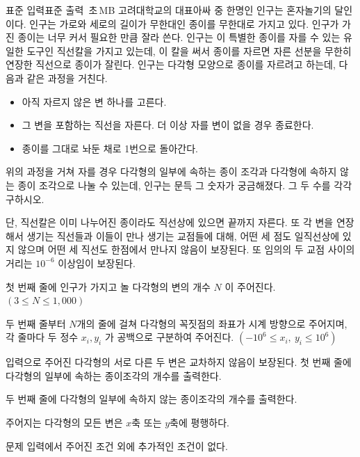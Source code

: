 \begin{problem}{\kcpcpapercuttitle}
    {표준 입력}{표준 출력}
    {\kcpcpapercuttime\,초}{\kcpcpapercutmemory\,MB}{}{\kcpcpapercutscore}
    고려대학교의 대표아싸 중 한명인 인구는 혼자놀기의 달인이다. 인구는 가로와 세로의 길이가 무한대인 종이를 무한대로 가지고 있다. 인구가 가진 종이는 너무 커서 필요한 만큼 잘라 쓴다. 인구는 이 특별한 종이를 자를 수 있는 유일한 도구인 직선칼을 가지고 있는데, 이 칼을 써서 종이를 자르면 자른 선분을 무한히 연장한 직선으로 종이가 잘린다. 인구는 다각형 모양으로 종이를 자르려고 하는데, 다음과 같은 과정을 거친다.
    
    \begin{itemize}
        \item 아직 자르지 않은 변 하나를 고른다.
        \item 그 변을 포함하는 직선을 자른다. 더 이상 자를 변이 없을 경우 종료한다.
        \item 종이를 그대로 놔둔 채로 1번으로 돌아간다.
    \end{itemize}
    위의 과정을 거쳐 자를 경우 다각형의 일부에 속하는 종이 조각과 다각형에 속하지 않는 종이 조각으로 나눌 수 있는데, 인구는 문득 그 숫자가 궁금해졌다. 그 두 수를 각각 구하시오.
    
    단, 직선칼은 이미 나누어진 종이라도 직선상에 있으면 끝까지 자른다. 또 각 변을 연장해서 생기는 직선들과 이들이 만나 생기는 교점들에 대해, 어떤 세 점도 일직선상에 있지 않으며 어떤 세 직선도 한점에서 만나지 않음이 보장된다. 또 임의의 두 교점 사이의 거리는 $ 10^{-6} $ 이상임이 보장된다.
    
    \InputFile
    첫 번째 줄에 인구가 가지고 놀 다각형의 변의 개수 $ N $ 이 주어진다. $ (3 \leq N \leq 1,000) $
    
    두 번째 줄부터 $ N $개의 줄에 걸쳐 다각형의 꼭짓점의 좌표가 시계 방향으로 주어지며, 각 줄마다 두 정수 $ x_i, y_i $ 가 공백으로 구분하여 주어진다. $ (-10^6 \leq x_i,\ y_i \leq 10^6) $
    
    입력으로 주어진 다각형의 서로 다른 두 변은 교차하지 않음이 보장된다.
    \OutputFile
    첫 번째 줄에 다각형의 일부에 속하는 종이조각의 개수를 출력한다.
    
    두 번째 줄에 다각형의 일부에 속하지 않는 종이조각의 개수를 출력한다.
    
    \SubtaskWithScore{\kcpcpapercutsmallscore}
    주어지는 다각형의 모든 변은 $ x $축 또는 $ y $축에 평행하다.
    
    \SubtaskWithScore{\kcpcpapercutlargescore}
    문제 입력에서 주어진 조건 외에 추가적인 조건이 없다.


\end{problem}
